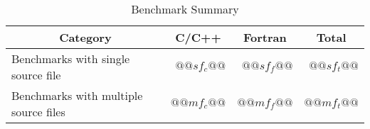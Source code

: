 \begin{table}[htp]
\caption{Benchmark Summary}
\label{Ta:benchmark_summary}
\begin{center}

\def\arraystretch{1.1}
\setlength\tabcolsep{7pt}

\begin{tabular}{|l|r|r|r|}
\hline

\multicolumn{1}{|c|}{\textbf{Category}} & \multicolumn{1}{|c|}{\textbf{C/C++}} & \multicolumn{1}{|c|}{\textbf{Fortran}} & \multicolumn{1}{|c|}{\textbf{Total}} \\ \hline \hline
Benchmarks with single source file & $@@sf_c@@$ & $@@sf_f@@$ & $@@sf_t@@$ \\ \hline
Benchmarks with multiple source files & $@@mf_c@@$ & $@@mf_f@@$ & $@@mf_t@@$ \\ \hline

\end{tabular}

\end{center}
\end{table}
